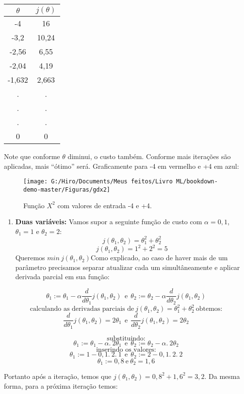 \documentclass[
]{book}
\providecommand{\tightlist}{%
  \setlength{\itemsep}{0pt}\setlength{\parskip}{0pt}}
\begin{document}
\begin{longtable}[]{@{}cc@{}}
\toprule
\textbf{\(\theta\)} & \textbf{\(j(\theta)\)}\tabularnewline
\midrule
\endhead
-4 & 16\tabularnewline
-3,2 & 10,24\tabularnewline
-2,56 & 6,55\tabularnewline
-2,04 & 4,19\tabularnewline
-1,632 & 2,663\tabularnewline
. & .\tabularnewline
. & .\tabularnewline
. & .\tabularnewline
0 & 0\tabularnewline
\bottomrule
\end{longtable}

Note que conforme \(\theta\) diminui, o custo também. Conforme mais iterações são aplicadas, mais ``ótimo'' será. Graficamente para -4 em vermelho e +4 em azul:

\begin{figure}

{\centering \texttt{[image: G:/Hiro/Documents/Meus feitos/Livro ML/bookdown-demo-master/Figuras/gdx2]} 

}

\caption{Função \(X^2\) com valores de entrada -4 e +4.}\label{fig:gdx2}
\end{figure}



\begin{enumerate}
\def\labelenumi{\arabic{enumi}.}
\setcounter{enumi}{1}
\tightlist
\item
  \textbf{Duas variáveis:} Vamos supor a seguinte função de custo com \(\alpha=0,1\), \(\theta_1=1\) e \(\theta_2=2\):
  \[j(\theta_1,\theta_2)=\theta_1^2+\theta_2^2\]
  \[j(\theta_1,\theta_2)=1^2+2^2=5\]
  Queremos \(min \ j(\theta_1,\theta_2)\)Como explicado, ao caso de haver mais de um parâmetro precisamos separar atualizar cada um simultâneamente e aplicar derivada parcial em sua função:
\end{enumerate}

\[\theta_1:=\theta_1-\alpha \frac{d}{d\theta_1}j(\theta_1,\theta_2) \ \ \mbox{e}\ \ \theta_2:=\theta_2-\alpha \frac{d}{d\theta_2}j(\theta_1,\theta_2)\]
\[\mbox{calculando as derivadas parciais de}\ j(\theta_1,\theta_2)=\theta_1^2+\theta_2^2\ \mbox{obtemos:}\]
\[\frac{d}{d\theta_1}j(\theta_1,\theta_2)=2\theta_1 \ \
\mbox{e}\ \ \frac{d}{d\theta_2}j(\theta_1,\theta_2)=2\theta_2\]

\[\mbox{substituindo:}\]
\[\theta_1:=\theta_1-\alpha.\ 2\theta_1 \ \ \mbox{e}\ \ \theta_2:=\theta_2-\alpha .\ 2\theta_2 \]
\[\mbox{inserindo os valores:}\]
\[\theta_1:=1-0,1.\ 2.\ 1 \ \ \mbox{e}\ \ \theta_2:=2-0,1.\ 2.\ 2\]
\[\theta_1:=0,8 \ \mbox{e} \ \theta_2=1,6\]

Portanto após a iteração, temos que \(j(\theta_1,\theta_2)=0,8^2+1,6^2=3,2\). Da mesma forma, para a próxima iteração temos:
\end{document}
